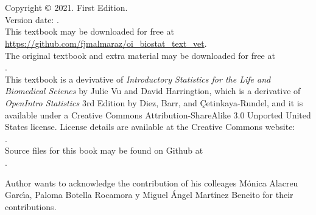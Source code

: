 \chapter*{}
\vfill


\noindent%
Copyright $\copyright$ 2021. First Edition. \\
Version date: \versiondate. \\


\noindent%
This textbook  may be downloaded for free at \\
\url{https://github.com/fjmalmaraz/oi_biostat_text_vet}. \\

The original textbook and extra material may be downloaded for free at \\
. \\

\noindent%
This textbook is a devivative of \emph{Introductory Statistics for the Life and Biomedical Scienes} by Julie Vu and David Harringtion, which is a derivative of \emph{OpenIntro Statistics} 3rd Edition by Diez, Barr, and \c{C}etinkaya-Rundel, and it is available under a Creative Commons Attribution-ShareAlike 3.0 Unported United States license. License details are available at the Creative Commons website: \\
. \\

\noindent%
Source files for this book may be found on Github at \\
.

Author wants to  acknowledge the contribution of his colleages M\'onica Alacreu Garc\'{\i}a, Paloma Botella Rocamora y Miguel \'Angel Mart\'inez Beneito for their contributions.  
